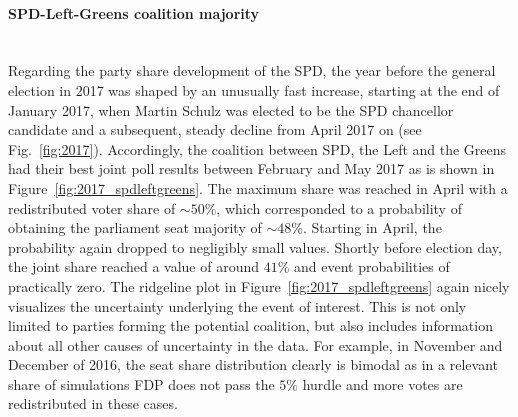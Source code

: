 \documentclass[smallcondensed]{svjour3}     %
\begin{document}
\paragraph{SPD-Left-Greens coalition majority} \ \\
Regarding the party share development of the SPD, the year before
the general election in 2017 was shaped by an unusually fast increase, starting
at the end of January 2017, when Martin Schulz was elected to be the SPD chancellor
candidate and a subsequent, steady decline from April 2017 on (see Fig.~\ref{fig:2017}).
Accordingly, the coalition between SPD, the Left and the Greens had
their best joint poll results between February and May 2017 as is shown in
Figure~\ref{fig:2017_spdleftgreens}.
The maximum share was reached in April with a redistributed voter
share of $\sim 50\%$, which corresponded to a probability of obtaining the
parliament seat majority of $\sim 48\%$.
Starting in April, the probability again dropped to negligibly small values.
Shortly before election day, the joint share
reached a value of around $41\%$ and event probabilities of practically zero.
The ridgeline plot in Figure~\ref{fig:2017_spdleftgreens}
again nicely visualizes the uncertainty underlying the event of
interest. This is not only limited to parties forming the potential coalition,
but also includes information about all other causes of uncertainty in the data.
For example, in November and December of 2016, the seat share distribution clearly
is bimodal as in a relevant share of simulations FDP does not pass
the $5\%$ hurdle and more votes are redistributed in these cases.
\end{document}
